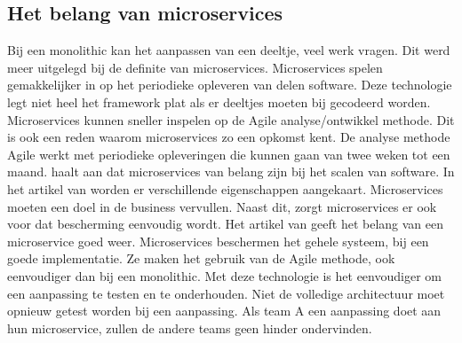 \subsection{Het belang van microservices}
Bij een monolithic kan het aanpassen van een deeltje, veel werk vragen. Dit werd meer uitgelegd bij de definite van microservices. Microservices spelen gemakkelijker in op het periodieke opleveren van delen software. Deze technologie legt niet heel het framework plat als er deeltjes moeten bij gecodeerd worden. Microservices kunnen sneller inspelen op de Agile analyse/ontwikkel methode. Dit is ook een reden waarom microservices zo een opkomst kent. De analyse methode Agile werkt met periodieke opleveringen die kunnen gaan van twee weken tot een maand. 
\textcite{series2018} haalt aan dat microservices van belang zijn bij het scalen van software.
In het artikel van \textcite{RDX2016} worden er verschillende eigenschappen aangekaart. Microservices moeten een doel in de business vervullen. Naast dit, zorgt microservices er ook voor dat bescherming eenvoudig wordt. 
Het artikel van \textcite{Watts2018} geeft het belang van een microservice goed weer. Microservices beschermen het gehele systeem, bij een goede implementatie. Ze maken het gebruik van de Agile methode, ook eenvoudiger dan bij een monolithic. Met deze technologie is het eenvoudiger om een aanpassing te testen en te onderhouden. Niet de volledige architectuur moet opnieuw getest worden bij een aanpassing. Als team A een aanpassing doet aan hun microservice, zullen de andere teams geen hinder ondervinden. 
